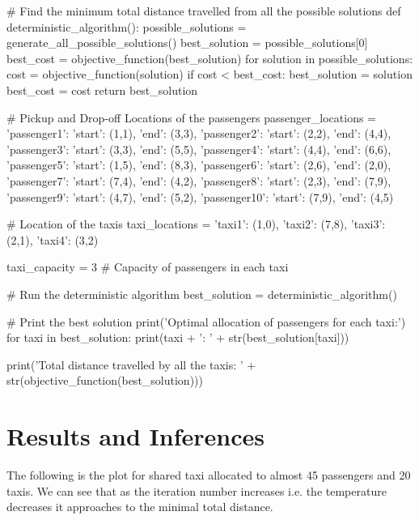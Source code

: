 \documentclass{article}
\begin{document}
\begin{pythoncode}    
# Find the minimum total distance travelled from all the possible solutions
def deterministic_algorithm():
  possible_solutions = generate_all_possible_solutions()
  best_solution = possible_solutions[0]
  best_cost = objective_function(best_solution)
  for solution in possible_solutions:
    cost = objective_function(solution)
    if cost < best_cost:
      best_solution = solution
      best_cost = cost
  return best_solution

# Pickup and Drop-off Locations of the passengers
passenger_locations = {
    'passenger1': {'start': (1,1), 'end': (3,3)},
    'passenger2': {'start': (2,2), 'end': (4,4)},
    'passenger3': {'start': (3,3), 'end': (5,5)},
    'passenger4': {'start': (4,4), 'end': (6,6)},
    'passenger5': {'start': (1,5), 'end': (8,3)},
    'passenger6': {'start': (2,6), 'end': (2,0)},
    'passenger7': {'start': (7,4), 'end': (4,2)},
    'passenger8': {'start': (2,3), 'end': (7,9)},
    'passenger9': {'start': (4,7), 'end': (5,2)},
    'passenger10': {'start': (7,9), 'end': (4,5)}
}

# Location of the taxis
taxi_locations = {
    'taxi1': (1,0),
    'taxi2': (7,8),
    'taxi3': (2,1),
    'taxi4': (3,2)
}

taxi_capacity = 3             # Capacity of passengers in each taxi


# Run the deterministic algorithm
best_solution = deterministic_algorithm()

# Print the best solution
print('Optimal allocation of passengers for each taxi:')
for taxi in best_solution:
  print(taxi + ': ' + str(best_solution[taxi]))

print('Total distance travelled by all the taxis: ' +
                            str(objective_function(best_solution)))
\end{pythoncode}

\newpage

\section{Results and Inferences}

The following is the plot for shared taxi allocated to almost 45 passengers and 20 taxis. We can see that as the iteration number increases i.e. the temperature decreases it approaches to the minimal total distance.
\end{document}
